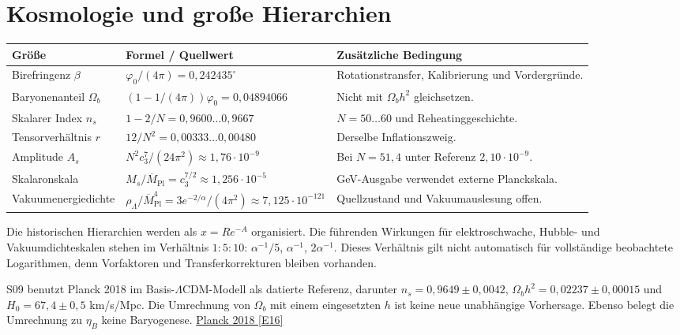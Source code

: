\section{Kosmologie und große Hierarchien}
\begin{longtable}{L{36mm}L{49mm}L{65mm}}
\toprule \textbf{Größe}&\textbf{Formel / Quellwert}&\textbf{Zusätzliche Bedingung}\\\midrule\endhead
Birefringenz $\beta$&$\varphi_0/(4\pi)=0{,}242435^\circ$&Rotationstransfer, Kalibrierung und Vordergründe.\\
Baryonenanteil $\Omega_b$&$(1-1/(4\pi))\varphi_0=0{,}04894066$&Nicht mit $\Omega_bh^2$ gleichsetzen.\\
Skalarer Index $n_s$&$1-2/N=0{,}9600\ldots0{,}9667$&$N=50\ldots60$ und Reheatinggeschichte.\\
Tensorverhältnis $r$&$12/N^2=0{,}00333\ldots0{,}00480$&Derselbe Inflationszweig.\\
Amplitude $A_s$&$N^2c_3^7/(24\pi^2)\approx1{,}76\cdot10^{-9}$&Bei $N=51{,}4$ unter Referenz $2{,}10\cdot10^{-9}$.\\
Skalaronskala&$M_s/\overline M_{\mathrm{Pl}}=c_3^{7/2}\approx1{,}256\cdot10^{-5}$&GeV-Ausgabe verwendet externe Planckskala.\\
Vakuumenergiedichte&$\rho_\Lambda/\overline M_{\mathrm{Pl}}^4=3e^{-2/\alpha}/(4\pi^2)\approx7{,}125\cdot10^{-121}$&Quellzustand und Vakuumauslesung offen.\\\bottomrule
\end{longtable}
Die historischen Hierarchien werden als $x=R e^{-A}$ organisiert. Die führenden Wirkungen für elektroschwache, Hubble- und Vakuumdichteskalen stehen im Verhältnis $1:5:10$: $\alpha^{-1}/5$, $\alpha^{-1}$, $2\alpha^{-1}$. Dieses Verhältnis gilt nicht automatisch für vollständige beobachtete Logarithmen, denn Vorfaktoren und Transferkorrekturen bleiben vorhanden.

S09 benutzt Planck 2018 im Basis-$\Lambda$CDM-Modell als datierte Referenz, darunter $n_s=0{,}9649\pm0{,}0042$, $\Omega_bh^2=0{,}02237\pm0{,}00015$ und $H_0=67{,}4\pm0{,}5$ km/s/Mpc. Die Umrechnung von $\Omega_b$ mit einem eingesetzten $h$ ist keine neue unabhängige Vorhersage. Ebenso belegt die Umrechnung zu $\eta_B$ keine Baryogenese. \href{https://arxiv.org/abs/1807.06209}{Planck 2018 [E16]}

